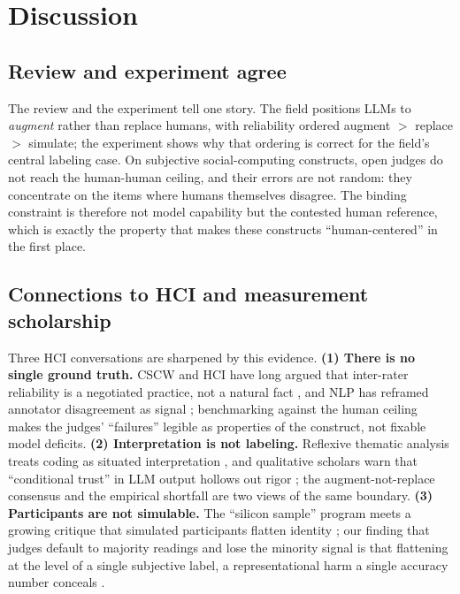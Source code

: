 \section{Discussion}
\subsection{Review and experiment agree}
The review and the experiment tell one story. The field positions LLMs to \emph{augment} rather than replace humans,
with reliability ordered augment $>$ replace $>$ simulate; the experiment shows why that ordering is correct for the
field's central labeling case. On subjective social-computing constructs, open judges do not reach the human-human
ceiling, and their errors are not random: they concentrate on the items where humans themselves disagree. The
binding constraint is therefore not model capability but the contested human reference, which is exactly the
property that makes these constructs ``human-centered'' in the first place.

\subsection{Connections to HCI and measurement scholarship}
Three HCI conversations are sharpened by this evidence. \textbf{(1) There is no single ground truth.} CSCW and HCI
have long argued that inter-rater reliability is a negotiated practice, not a natural fact
\citep{mcdonald2019reliability}, and NLP has reframed annotator disagreement as signal \citep{aroyo2015truth,
plank2022humanlabel}; benchmarking against the human ceiling makes the judges' ``failures'' legible as properties of
the construct, not fixable model deficits. \textbf{(2) Interpretation is not labeling.} Reflexive thematic analysis
treats coding as situated interpretation \citep{braun2006thematic}, and qualitative scholars warn that ``conditional
trust'' in LLM output hollows out rigor \citep{schroeder2025usestensions,davison2024ethics}; the augment-not-replace
consensus and the empirical shortfall are two views of the same boundary. \textbf{(3) Participants are not
simulable.} The ``silicon sample'' program \citep{argyle2023outofone} meets a growing critique that simulated
participants flatten identity \citep{wang2024flatten,cheng2023compost,bisbee2023perils,salminen2025syntheticcritical};
our finding that judges default to majority readings and lose the minority signal is that flattening at the level of
a single subjective label, a representational harm a single accuracy number conceals \citep{fricker2007epistemic,
birhane2022values}.

